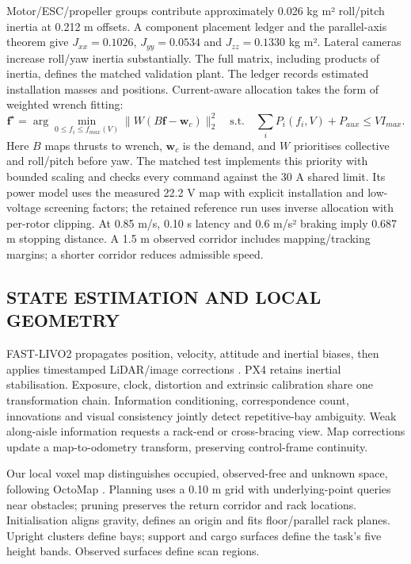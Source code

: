 \documentclass[a4paper,11pt]{article}
\begin{document}
Motor/ESC/propeller groups contribute approximately 0.026 kg m² roll/pitch inertia at 0.212 m offsets. A component placement ledger and the parallel-axis theorem give $J_{xx}=0.1026$, $J_{yy}=0.0534$ and $J_{zz}=0.1330$ kg m². Lateral cameras increase roll/yaw inertia substantially. The full matrix, including products of inertia, defines the matched validation plant. The ledger records estimated installation masses and positions. Current-aware allocation takes the form of weighted wrench fitting:
\begin{equation}\boldsymbol f^\star=\arg\min_{0\le f_i\le f_{max}(V)}\|W(B\boldsymbol f-\boldsymbol w_c)\|_2^2\quad\mathrm{s.t.}\quad\sum_i P_i(f_i,V)+P_{aux}\le VI_{max}.\end{equation}
Here $B$ maps thrusts to wrench, $\boldsymbol w_c$ is the demand, and $W$ prioritises collective and roll/pitch before yaw. The matched test implements this priority with bounded scaling and checks every command against the 30 A shared limit. Its power model uses the measured 22.2 V map with explicit installation and low-voltage screening factors; the retained reference run uses inverse allocation with per-rotor clipping. At 0.85 m/s, 0.10 s latency and 0.6 m/s² braking imply 0.687 m stopping distance. A 1.5 m observed corridor includes mapping/tracking margins; a shorter corridor reduces admissible speed.

\subsection{S{\fontsize{9.2}{14}\selectfont TATE} {\fontsize{9.2}{14}\selectfont ESTIMATION} {\fontsize{9.2}{14}\selectfont AND} {\fontsize{9.2}{14}\selectfont LOCAL} {\fontsize{9.2}{14}\selectfont GEOMETRY}}
FAST-LIVO2 propagates position, velocity, attitude and inertial biases, then applies timestamped LiDAR/image corrections \cite{r21,r43}. PX4 retains inertial stabilisation. Exposure, clock, distortion and extrinsic calibration share one transformation chain. Information conditioning, correspondence count, innovations and visual consistency jointly detect repetitive-bay ambiguity. Weak along-aisle information requests a rack-end or cross-bracing view. Map corrections update a map-to-odometry transform, preserving control-frame continuity.

Our local voxel map distinguishes occupied, observed-free and unknown space, following OctoMap \cite{r25}. Planning uses a 0.10 m grid with underlying-point queries near obstacles; pruning preserves the return corridor and rack locations. Initialisation aligns gravity, defines an origin and fits floor/parallel rack planes. Upright clusters define bays; support and cargo surfaces define the task's five height bands. Observed surfaces define scan regions.
\end{document}
